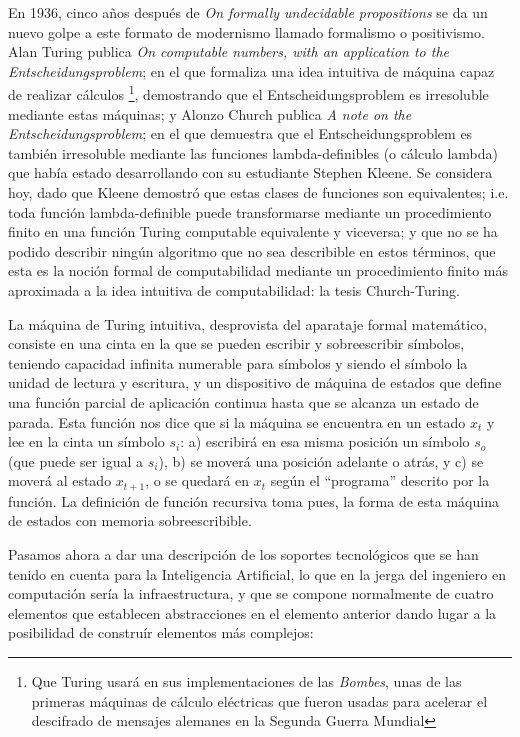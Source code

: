 \documentclass[12pt]{memoir}
\begin{document}
En 1936, cinco años después de \textit{On formally undecidable propositions} se da un nuevo golpe a este formato de modernismo llamado formalismo o positivismo. Alan Turing publica \textit{On computable numbers, with an application to the Entscheidungsproblem}; en el que formaliza una idea intuitiva de máquina capaz de realizar cálculos \footnote{Que Turing usará en sus implementaciones de las \textit{Bombes}, unas de las primeras máquinas de cálculo eléctricas que fueron usadas para acelerar el descifrado de mensajes alemanes en la Segunda Guerra Mundial}, demostrando que el Entscheidungsproblem es irresoluble mediante estas máquinas; y Alonzo Church publica \textit{A note on the Entscheidungsproblem}; en el que demuestra que el Entscheidungsproblem es también irresoluble mediante las funciones lambda-definibles (o cálculo lambda) que había estado desarrollando con su estudiante Stephen Kleene. Se considera hoy, dado que Kleene demostró que estas clases de funciones son equivalentes; i.e. toda función lambda-definible puede transformarse mediante un procedimiento finito en una función Turing computable equivalente y viceversa; y que no se ha podido describir ningún algoritmo que no sea describible en estos términos, que esta es la noción formal de computabilidad mediante un procedimiento finito más aproximada a la idea intuitiva de computabilidad: la tesis Church-Turing.

La máquina de Turing intuitiva, desprovista del aparataje formal matemático, consiste en una cinta en la que se pueden escribir y sobreescribir símbolos, teniendo capacidad infinita numerable para símbolos y siendo el símbolo la unidad de lectura y escritura, y un dispositivo de máquina de estados que define una función parcial de aplicación continua hasta que se alcanza un estado de parada. Esta función nos dice que si la máquina se encuentra en un estado $x_{t}$ y lee en la cinta un símbolo $s_i$: a) escribirá en esa misma posición un símbolo $s_o$ (que puede ser igual a $s_i$), b) se moverá una posición adelante o atrás, y c) se moverá al estado $x_{t+1}$, o se quedará en $x_{t}$ según el ``programa'' descrito por la función. La definición de función recursiva toma pues, la forma de esta máquina de estados con memoria sobreescribible. 

Pasamos ahora a dar una descripción de los soportes tecnológicos que se han tenido en cuenta para la Inteligencia Artificial, lo que en la jerga del ingeniero en computación sería la infraestructura, y que se compone normalmente de cuatro elementos que establecen abstracciones en el elemento anterior dando lugar a la posibilidad de construír elementos más complejos:
\end{document}
